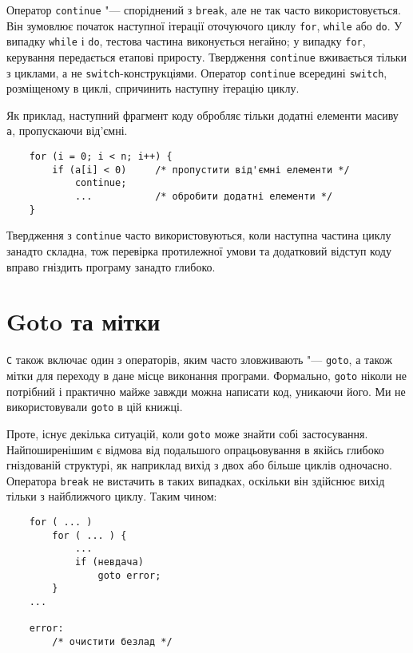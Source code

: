 \documentclass[a4paper,12pt]{book}
\begin{document}
  Оператор \texttt{continue} "--- споріднений з \texttt{break}, але не так часто
  використовується. Він зумовлює початок наступної ітерації оточуючого циклу \texttt{for},
  \texttt{while} або \texttt{do}. У випадку \texttt{while} і \texttt{do}, тестова частина
  виконується негайно; у випадку \texttt{for}, керування передається етапові приросту.
  Твердження \texttt{continue} вживається тільки з циклами, а не
  \texttt{switch}-конструкціями. Оператор \texttt{continue} всередині \texttt{switch},
  розміщеному в циклі, спричинить наступну ітерацію циклу.

  Як приклад, наступний фрагмент коду обробляє тільки додатні елементи масиву
  \texttt{a}, пропускаючи від'ємні.
  \begin{verbatim}
    for (i = 0; i < n; i++) {
        if (a[i] < 0)     /* пропустити від'ємні елементи */
            continue;
            ...           /* обробити додатні елементи */
    }
  \end{verbatim}

  Твердження з \texttt{continue} часто використовуються, коли наступна частина циклу
  занадто складна, тож перевірка протилежної умови та додатковий відступ коду вправо
  гніздить програму занадто глибоко.

\section{Goto та мітки}


  \texttt{C} також включає один з операторів, яким часто зловживають "---
  \texttt{goto}, а також мітки для переходу в дане місце виконання програми. Формально,
  \texttt{goto} ніколи не потрібний і практично майже завжди можна написати код, уникаючи
  його. Ми не використовували \texttt{goto} в цій книжці.

  Проте, існує декілька ситуацій, коли \texttt{goto} може знайти собі застосування.
  Найпоширенішим є відмова від подальшого опрацьовування в якійсь глибоко гніздованій
  структурі, як наприклад вихід з двох або більше циклів одночасно. Оператора
  \texttt{break} не вистачить в таких випадках, оскільки він здійснює вихід тільки з
  найближчого циклу. Таким чином:
  \begin{verbatim}
    for ( ... )
        for ( ... ) {
            ...
            if (невдача)
                goto error;
        }
    ...

    error:
        /* очистити безлад */
  \end{verbatim}
\end{document}
